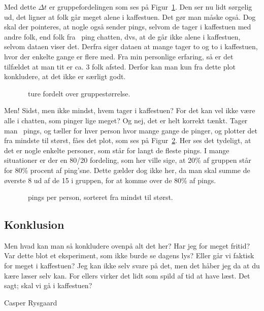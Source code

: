 \begin{article}
\noindent
Med dette $\Delta t$ er gruppefordelingen som ses på Figur~\ref{fig:4}. Den ser nu lidt sørgelig ud, det ligner at folk går meget alene i kaffestuen. Det gør man måske også. Dog skal der pointeres, at nogle også sender pings, selvom de tager i kaffestuen med andre folk, end folk fra \coffee\ ping chatten, dvs, at de går ikke alene i kaffestuen, selvom dataen viser det. Derfra siger dataen at mange tager to og to i kaffestuen, hvor der enkelte gange er flere med. Fra min personlige erfaring, så er det tilfældet at man tit er ca. 3 folk afsted. Derfor kan man kun fra dette plot konkludere, at det ikke er særligt godt.

\begin{figure}[H]
	\centering
	\resizebox{\columnwidth}{!}{}
	\vspace{-25pt}
	\caption{\protect\coffee\ ture fordelt over gruppestørrelse.}
	\label{fig:4}
\end{figure}

Men! Sidst, men ikke mindst, hvem tager i kaffestuen? For det kan vel ikke være alle i chatten, som pinger lige meget? Og nej, det er helt korrekt tænkt. Tager man \coffee\ pings, og tæller for hver person hvor mange gange de pinger, og plotter det fra mindste til størst, fåes det plot, som ses på Figur~\ref{fig:5}. Her ses det tydeligt, at det er nogle enkelte personer, som står for langt de fleste pings. I mange situationer er der en 80/20 fordeling, som her ville sige, at 20\% af gruppen står for 80\% procent af ping'sne. Dette gælder dog ikke her, da man skal summe de øverste 8 ud af de 15 i gruppen, for at komme over de 80\% af pings.

\begin{figure}[H]
	\centering
	\resizebox{\columnwidth}{!}{}
	\vspace{-25pt}
	\caption{\protect\coffee\ pings per person, sorteret fra mindst til størst.}
	\label{fig:5}
\end{figure}


\subsection*{Konklusion}

Men hvad kan man så konkludere ovenpå alt det her? Har jeg for meget fritid? Var dette blot et eksperiment, som ikke burde se dagens lys? Eller går vi faktisk for meget i kaffestuen?
Jeg kan ikke selv svare på det, men det håber jeg da at du kære læser selv kan. For ellers virker det lidt som spild af tid at have læst.
Det sagt; skal vi gå i kaffestuen? \coffee\


\end{article}

\begin{flushright}
Casper Rysgaard
\end{flushright}

